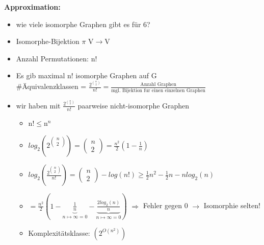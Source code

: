 \newpage
\textbf{Approximation:}
\begin{itemize}
	\item wie viele isomorphe Graphen gibt es für 6?
	\item Isomorphe-Bijektion $\pi$ V$\rightarrow$V
	\item Anzahl Permutationen: n!
	\item Es gib maximal n! isomorphe Graphen auf G\\
	
\hspace*{2cm}\#Äquivalenzklassen = $\frac{2^{\binom{n}{2}}}{n!}=\frac{\text{Anzahl Graphen}}{\text{mgl. Bijektion fur einen einzelnen Graphen}}$\\
	\item wir haben mit $\frac{2^{\binom{n}{2}}}{n!}$ paarweise nicht-isomorphe Graphen\\
	\begin{itemize}
		\item n!$\leq$n$^n$
		\item $log_2(2^{\begin{pmatrix}n\\2\end{pmatrix}}) = \begin{pmatrix}n\\2\end{pmatrix} = \frac{n^2}{2}(1-\frac{1}{n})$
		\item $log_2(\frac{2^{\begin{pmatrix}n\\2\end{pmatrix}}}{n!}) = \begin{pmatrix}n\\2\end{pmatrix} - log(n!) \geq \frac{1}{2}n^2-\frac{1}{2}n-n log_2(n)$
		\item $=\frac{n^2}{2}(1-\underbrace{\frac{1}{n}}_{n\mapsto \infty=0}-\underbrace{\frac{2 log_2(n)}{n}}_{n\mapsto \infty=0})$ $\Rightarrow$ Fehler gegen 0 $\rightarrow$ Isomorphie selten!
		\item  Komplexitätsklasse: $(2^{O(n^2)})$
	\end{itemize}
\end{itemize}

